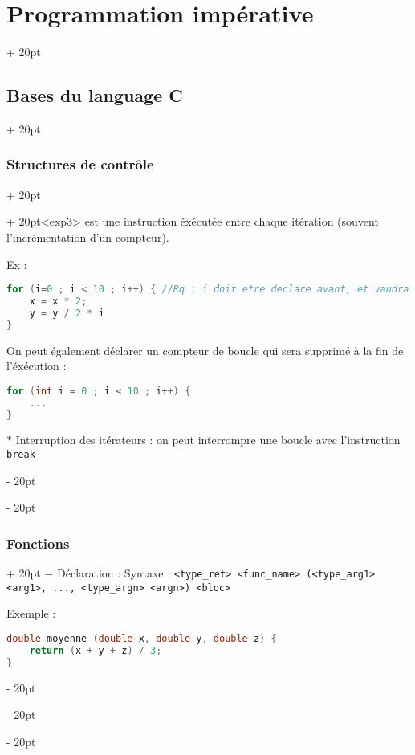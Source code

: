 \documentclass[a4paper, 12pt, twoside]{article}
\newcommand{\ind}[1][20pt]{\advance\leftskip + #1}
\newcommand{\deind}[1][20pt]{\advance\leftskip - #1}
\newenvironment{indentedenv}[1][20pt]{\par \ind[#1]}{\par \deind}
\newenvironment{indt}[2][20pt]{#2 \begin{indentedenv}[#1]}{\end{indentedenv}} %
\begin{document}
\begin{indt}{\section{Programmation impérative}}
\begin{indt}{\subsection{Bases du language C}}
\begin{indt}{\subsubsection{Structures de contrôle}}
\begin{indt}
                    \texttt{<exp3>} est une instruction éxécutée entre chaque itération (souvent l'incrémentation d'un compteur).
                    
                    \vspace{6pt}
                    
                    Ex :
                    
                    \begin{lstlisting}[language=C, xleftmargin=100pt]
for (i=0 ; i < 10 ; i++) { //Rq : i doit etre declare avant, et vaudra 10 a la fin de l execution
    x = x * 2;
    y = y / 2 * i
}\end{lstlisting}
                    
                    On peut également déclarer un compteur de boucle qui sera supprimé à la fin de l'éxécution :
                    
                    \begin{lstlisting}[language=C, xleftmargin=100pt]
for (int i = 0 ; i < 10 ; i++) {
    ...
}\end{lstlisting}
                    
                    \vspace{6pt}
                    
                    $*$ Interruption des itérateurs : on peut interrompre une boucle avec l'instruction \texttt{break}
                    
                \end{indt}
                
            \end{indt}
            
            \vspace{12pt}
            
            \begin{indt}{\subsubsection{Fonctions}}
                $-$ Déclaration : Syntaxe : \texttt{<type\_ret> <func\_name> (<type\_arg1> <arg1>, ..., <type\_argn> <argn>) <bloc>}
                
                Exemple :
                    
                \begin{lstlisting}[language=C, xleftmargin=80pt]
double moyenne (double x, double y, double z) {
    return (x + y + z) / 3;
}\end{lstlisting}
                

\end{indt}
\end{indt}
\end{indt}
\end{document}
